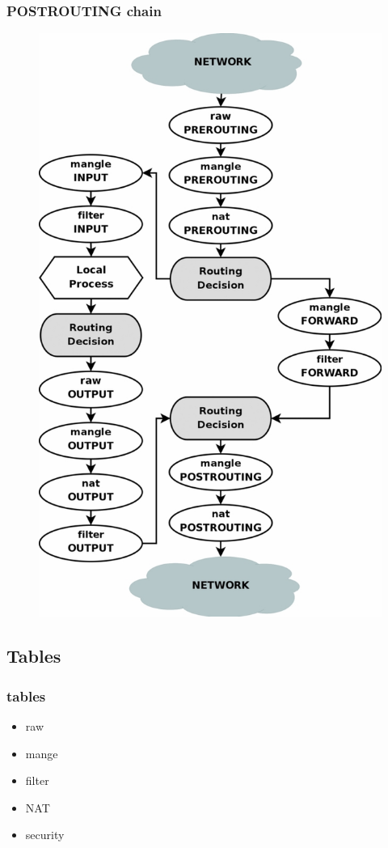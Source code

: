 \documentclass{beamer}
\begin{document}
\begin{frame}
\frametitle{POSTROUTING chain}
\begin{figure}
\includegraphics[trim={0 0 0 24cm},clip, width=\textwidth]{tables_traverse}
\end{figure}
\end{frame}

\subsection{Tables}

\begin{frame}
\frametitle{tables}
\begin{itemize}
\item raw
\item mange
\item filter
\item NAT
\item security
\end{itemize}
\end{frame}
\end{document}
